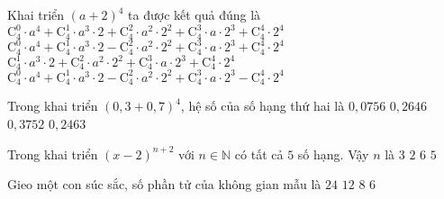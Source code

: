 \begin{ex}%
	Khai triển $(a+2)^4$ ta được kết quả đúng là
	\choice
	{\True $\mathrm{C}_4^0\cdot a^4+\mathrm{C}_4^1\cdot a^3\cdot 2+\mathrm{C}_4^2\cdot a^2\cdot 2^2+\mathrm{C}_4^3\cdot a\cdot 2^3+\mathrm{C}_4^4\cdot 2^4$}
	{$\mathrm{C}_4^0\cdot a^4+\mathrm{C}_4^1\cdot a^3\cdot 2-\mathrm{C}_4^2\cdot a^2\cdot 2^2+\mathrm{C}_4^3\cdot a\cdot 2^3+\mathrm{C}_4^4\cdot 2^4$}
	{$\mathrm{C}_4^1\cdot a^3\cdot 2+\mathrm{C}_4^2\cdot a^2\cdot 2^2+\mathrm{C}_4^3\cdot a\cdot 2^3+\mathrm{C}_4^4\cdot 2^4$}
	{$\mathrm{C}_4^0\cdot a^4+\mathrm{C}_4^1\cdot a^3\cdot 2-\mathrm{C}_4^2\cdot a^2\cdot 2^2+\mathrm{C}_4^3\cdot a\cdot 2^3-\mathrm{C}_4^4\cdot 2^4$}
\end{ex}
\begin{ex}%
	Trong khai triển $(0{,}3+0{,}7)^4$, hệ số của số hạng thứ hai là
	\choice
	{\True $0{,}0756$}
	{$0{,}2646$}
	{$0{,}3752$}
	{$0{,}2463$}
\end{ex}
\begin{ex}%
	Trong khai triển $(x-2)^{n+2}$ với $n\in\mathbb{N}$ có tất cả $5$ số hạng. Vậy $n$ là
	\choice
	{$3$}
	{\True $2$}
	{$6$}
	{$5$}
\end{ex}
\begin{ex}%
	Gieo một con súc sắc, số phần tử của không gian mẫu là
	\choice
	{$24$}
	{$12$}
	{$8$}
	{\True $6$}
\end{ex}
